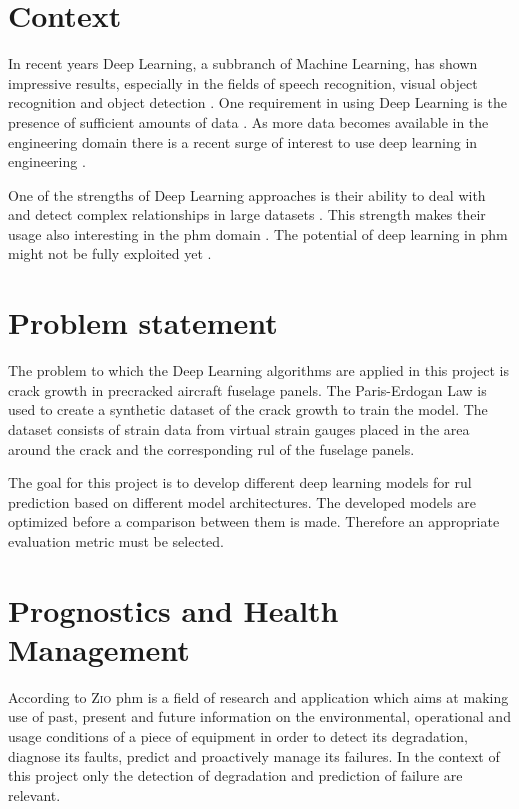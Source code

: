 \documentclass[conference]{IEEEtran}
\begin{document}
\IEEEpeerreviewmaketitle

\section{Context}
\label{sec:problem-statement}

In recent years Deep Learning, a subbranch of Machine Learning, has shown impressive results, especially in the fields of speech recognition, visual object recognition and object detection \cite{LeCun2015}. One requirement in using Deep Learning is the presence of sufficient amounts of data \cite{Sikorska2011}. As more data becomes available in the engineering domain there is a recent surge of interest to use deep learning in engineering \cite{Voulodimos2018}.

One of the strengths of Deep Learning approaches is their ability to deal with and detect complex relationships in large datasets \cite{MONTEROJIMENEZ2020539}. This strength makes their usage also interesting in the \gls{phm} domain \cite{Wu2015}. The potential of deep learning in \gls{phm} might not be fully exploited yet \cite{Akrim2021}.

\section{Problem statement}
\label{sec:problem-statement}

The problem to which the Deep Learning algorithms are applied in this project is crack growth in precracked aircraft fuselage panels. The Paris-Erdogan Law \cite{Paris1963} is used to create a synthetic dataset of the crack growth to train the model. The dataset consists of strain data from virtual strain gauges placed in the area around the crack and the corresponding \gls{rul} of the fuselage panels.

The goal for this project is to develop different deep learning models for \gls{rul} prediction based on different model architectures. The developed models are optimized before a comparison between them is made. Therefore an appropriate evaluation metric must be selected.

\section{Prognostics and Health Management}
\label{sec:Prognostics-and-Health-Management}

According to \textsc{Zio} \cite{Zio2012} \gls{phm} is a field of research and application which aims at making use of past, present and future information on the environmental, operational and usage conditions of a piece of equipment in order to detect its degradation, diagnose its faults, predict and proactively manage its failures. In the context of this project only the detection of degradation and prediction of failure are relevant.
\end{document}
